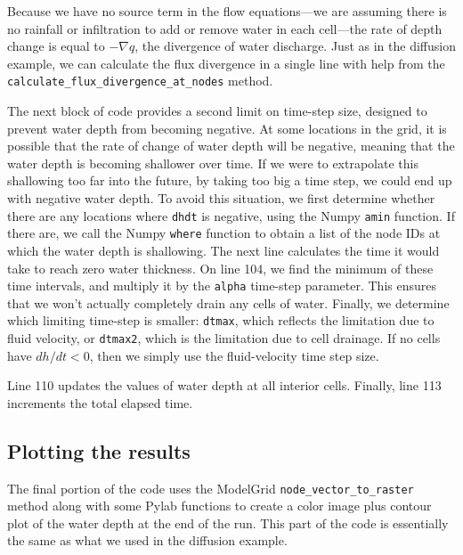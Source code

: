 \documentclass[12pt]{article}
\newcommand{\code}[1]{{\tt #1}}
\begin{document}


Because we have no source term in the flow equations---we are assuming there is no rainfall or infiltration to add or remove water in each cell---the rate of depth change is equal to $-\nabla q$, the divergence of water discharge. Just as in the diffusion example, we can calculate the flux divergence in a single line with help from the \code{calculate\_flux\_divergence\_at\_nodes} method.

The next block of code provides a second limit on time-step size, designed to prevent water depth from becoming negative. At some locations in the grid, it is possible that the rate of change of water depth will be negative, meaning that the water depth is becoming shallower over time. If we were to extrapolate this shallowing too far into the future, by taking too big a time step, we could end up with negative water depth. To avoid this situation, we first determine whether there are any locations where \code{dhdt} is negative, using the Numpy \code{amin} function. If there are, we call the Numpy \code{where} function to obtain a list of the node IDs at which the water depth is shallowing. The next line calculates the time it would take to reach zero water thickness. On line 104, we find the minimum of these time intervals, and multiply it by the \code{alpha} time-step parameter. This ensures that we won't actually completely drain any cells of water. Finally, we determine which limiting time-step is smaller: \code{dtmax}, which reflects the limitation due to fluid velocity, or \code{dtmax2}, which is the limitation due to cell drainage. If no cells have $dh/dt<0$, then we simply use the fluid-velocity time step size.

Line 110 updates the values of water depth at all interior cells. Finally, line 113 increments the total elapsed time.

\subsection{Plotting the results}



The final portion of the code uses the ModelGrid \code{node\_vector\_to\_raster} method along with some Pylab functions to create a color image plus contour plot of the water depth at the end of the run. This part of the code is essentially the same as what we used in the diffusion example.
\end{document}
